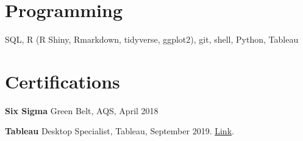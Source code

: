 \documentclass[margin, line]{res}
\begin{document}
\begin{resume}
\section{\sc Programming} 
SQL, R (R Shiny, Rmarkdown, tidyverse, ggplot2), git, shell, Python, Tableau


\section{\sc Certifications }
{\bf Six Sigma} Green Belt, AQS, April 2018
\vspace*{-3mm}

{\bf Tableau} Desktop Specialist, Tableau, September 2019. \href{https://www.credly.com/badges/e9a605a8-1977-4a1c-ab24-149a37c7fb36/linked_in_profile}{Link}.
\vspace*{-3mm}

\end{resume}
\end{document}
